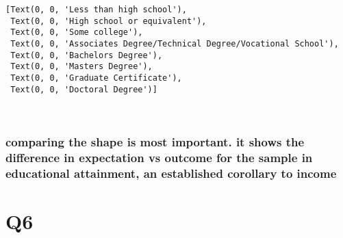 \documentclass[11pt]{article}
\makeatletter
\newcommand{\boxspacing}{\kern\kvtcb@left@rule\kern\kvtcb@boxsep}
\newcommand{\prompt}[4]{
        \ttfamily\llap{{\color{#2}[#3]:\hspace{3pt}#4}}\vspace{-\baselineskip}
    }
\makeatother
\begin{document}
            \begin{tcolorbox}[breakable, size=fbox, boxrule=.5pt, pad at break*=1mm, opacityfill=0]
\prompt{Out}{outcolor}{47}{\boxspacing}
\begin{Verbatim}[commandchars=\\\{\}]
[Text(0, 0, 'Less than high school'),
 Text(0, 0, 'High school or equivalent'),
 Text(0, 0, 'Some college'),
 Text(0, 0, 'Associates Degree/Technical Degree/Vocational School'),
 Text(0, 0, 'Bachelors Degree'),
 Text(0, 0, 'Masters Degree'),
 Text(0, 0, 'Graduate Certificate'),
 Text(0, 0, 'Doctoral Degree')]
\end{Verbatim}
\end{tcolorbox}
        
    \begin{center}
    \end{center}
    { \hspace*{\fill} \\}
    
    \hypertarget{comparing-the-shape-is-most-important.-it-shows-the-difference-in-expectation-vs-outcome-for-the-sample-in-educational-attainment-an-established-corollary-to-income}{%
\subsubsection{comparing the shape is most important. it shows the
difference in expectation vs outcome for the sample in educational
attainment, an established corollary to
income}\label{comparing-the-shape-is-most-important.-it-shows-the-difference-in-expectation-vs-outcome-for-the-sample-in-educational-attainment-an-established-corollary-to-income}}

    \hypertarget{q6}{%
\section{Q6}\label{q6}}
\end{document}
